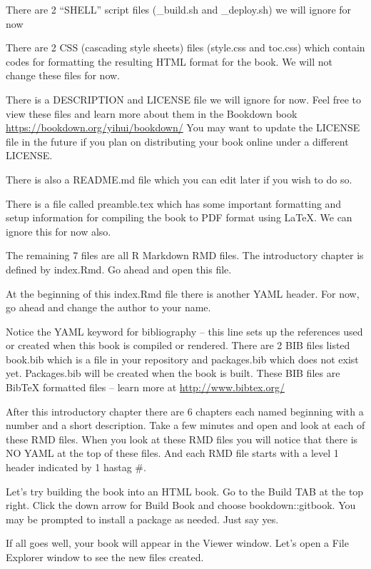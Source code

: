 \documentclass[
]{book}
\begin{document}
There are 2 ``SHELL'' script files (\_build.sh and \_deploy.sh) we will ignore for now

There are 2 CSS (cascading style sheets) files (style.css and toc.css) which contain codes for formatting the resulting HTML format for the book. We will not change these files for now.

There is a DESCRIPTION and LICENSE file we will ignore for now. Feel free to view these files and learn more about them in the Bookdown book \url{https://bookdown.org/yihui/bookdown/} You may want to update the LICENSE file in the future if you plan on distributing your book online under a different LICENSE.

There is also a README.md file which you can edit later if you wish to do so.

There is a file called preamble.tex which has some important formatting and setup information for compiling the book to PDF format using LaTeX. We can ignore this for now also.

The remaining 7 files are all R Markdown RMD files. The introductory chapter is defined by index.Rmd. Go ahead and open this file.

At the beginning of this index.Rmd file there is another YAML header. For now, go ahead and change the author to your name.

Notice the YAML keyword for bibliography -- this line sets up the references used or created when this book is compiled or rendered. There are 2 BIB files listed book.bib which is a file in your repository and packages.bib which does not exist yet. Packages.bib will be created when the book is built. These BIB files are BibTeX formatted files -- learn more at \url{http://www.bibtex.org/}

After this introductory chapter there are 6 chapters each named beginning with a number and a short description. Take a few minutes and open and look at each of these RMD files. When you look at these RMD files you will notice that there is NO YAML at the top of these files. And each RMD file starts with a level 1 header indicated by 1 hastag \#.

Let's try building the book into an HTML book. Go to the Build TAB at the top right. Click the down arrow for Build Book and choose bookdown::gitbook. You may be prompted to install a package as needed. Just say yes.

If all goes well, your book will appear in the Viewer window. Let's open a File Explorer window to see the new files created.
\end{document}
